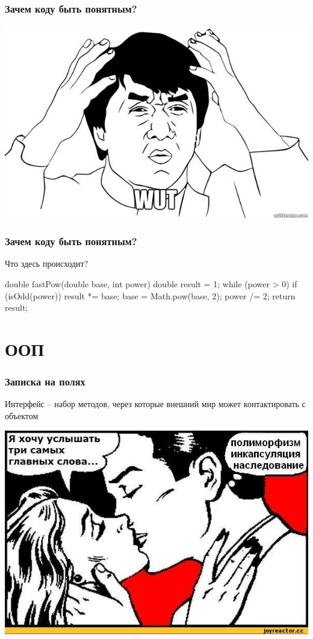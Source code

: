 \documentclass[russian,aspectratio=169,14pt]{beamer}
\begin{document}
\begin{frame}
	\frametitle{Зачем коду быть понятным?}
	\begin{center}
	\includegraphics[height=0.7\textheight]{wut.jpg}
	\end{center}
\end{frame}

\begin{frame}[fragile]
	\frametitle{Зачем коду быть понятным?}
	Что здесь происходит?
	\vfill
	\begin{listjava}
double fastPow(double base, int power) {
    double result = 1;
    while (power > 0) {
        if (isOdd(power)) {
            result *= base;
        }
        base = Math.pow(base, 2);
        power /= 2;
    }
    return result;
}
	\end{listjava}
\end{frame}

\section{ООП}

\begin{frame}
	\frametitle{Записка на полях}
	Интерфейс -- набор методов, через которые внешний мир может контактировать с объектом
\end{frame}

\begin{frame}
	\begin{center}
	\includegraphics[height=0.8\textheight]{3_words.jpeg}
	\end{center}
\end{frame}
\end{document}
